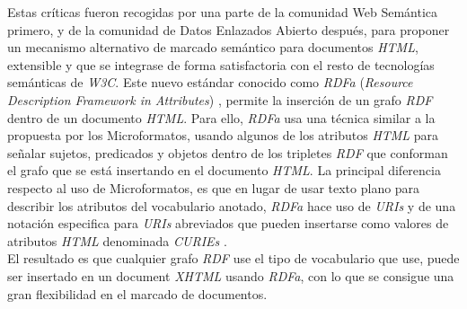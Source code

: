 Estas cr\'iticas fueron recogidas por una parte de la comunidad Web Sem\'antica primero, y de la comunidad de Datos Enlazados Abierto despu\'es, para proponer un mecanismo alternativo de marcado sem\'antico para documentos \textit{HTML}, extensible y que se integrase de forma satisfactoria con el resto de tecnolog\'ias sem\'anticas de \textit{W3C}. Este nuevo est\'andar conocido como \textit{RDFa} (\textit{Resource Description Framework in Attributes}) \cite{rdfa}, permite la inserci\'on de un grafo \textit{RDF} dentro de un documento \textit{HTML}. Para ello, \textit{RDFa} usa una t\'ecnica similar a la propuesta por los Microformatos, usando algunos de los atributos \textit{HTML} para se\~nalar sujetos, predicados y objetos dentro de los tripletes \textit{RDF} que conforman el grafo que se est\'a insertando en el documento \textit{HTML}. La principal diferencia respecto al uso de Microformatos, es que en lugar de usar texto plano para describir los atributos del vocabulario anotado, \textit{RDFa} hace uso de \textit{URIs} y de una notaci\'on especifica para \textit{URIs} abreviados que pueden insertarse como valores de atributos \textit{HTML} denominada \textit{CURIEs} \cite{curies}.\\
El resultado es que cualquier grafo \textit{RDF} use el tipo de vocabulario que use, puede ser insertado en un document \textit{XHTML} usando \textit{RDFa}, con lo que se consigue una gran flexibilidad en el marcado de documentos.\\
